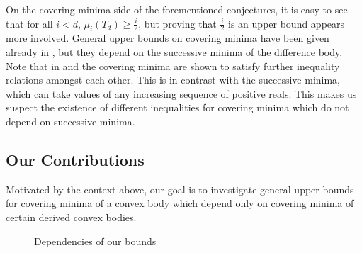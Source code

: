 \documentclass{amsart}
\theoremstyle{definition}
\theoremstyle{remark}
\begin{document}
On the covering minima side of the forementioned conjectures, it is easy to see that for all $i<d$, $\mu_i(T_d)\geqslant \frac{i}{2}$, but proving that $\frac{i}{2}$ is an upper bound appears more involved. General upper bounds on covering minima have been given already in \cite{KannanLovasz}, but they depend on the successive minima of the difference body.  Note that in \cite{KannanLovasz} and \cite{AverkovWagner} the covering minima are shown to satisfy further inequality relations amongst each other. This is in contrast with the successive minima, which can take values of any increasing sequence of positive reals. This makes us suspect the existence of different inequalities for covering minima which do not depend on successive minima.




\subsection{Our Contributions}
Motivated by the context above, our goal is to investigate general upper bounds for covering minima of a convex body which depend only on covering minima of certain derived convex bodies.

\begin{figure}[h!]
    \centering

    \begin{minipage}{0.45\linewidth} 
        \centering
        \vspace{0.25cm}
    \end{minipage}
    \hspace{0.05\linewidth} 
    \begin{minipage}{0.45\linewidth}
        \centering
        \vspace{0.25cm}
    \end{minipage}

    \caption{Dependencies of our bounds}
    \label{fig: bounds}
\end{figure}
\end{document}
